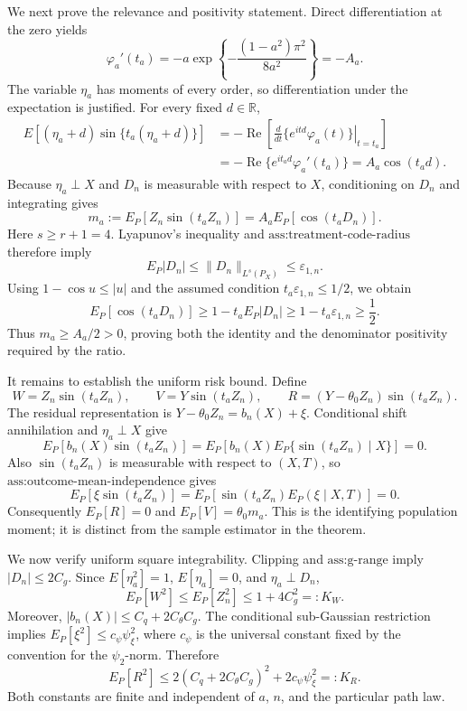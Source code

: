 We next prove the relevance and positivity statement.  Direct differentiation at the zero yields
\[
 \varphi_a'(t_a)
 =-a\exp\!\left\{-\frac{(1-a^2)\pi^2}{8a^2}\right\}
 =-A_a.
\]
The variable \(\eta_a\) has moments of every order, so differentiation under the expectation is justified.  For every fixed \(d\in\mathbb R\),
\[
\begin{aligned}
 E[(\eta_a+d)\sin\{t_a(\eta_a+d)\}]
 &=-\operatorname{Re}\!\left[
   \left.\frac{d}{dt}\{e^{itd}\varphi_a(t)\}\right|_{t=t_a}
 \right]\\
 &=-\operatorname{Re}\{e^{it_ad}\varphi_a'(t_a)\}
 =A_a\cos(t_ad).
\end{aligned}
\]
Because \(\eta_a\perp X\) and \(D_n\) is measurable with respect to \(X\), conditioning on \(D_n\) and integrating gives
\[
 m_a:=E_P[Z_n\sin(t_aZ_n)]
 =A_aE_P[\cos(t_aD_n)].
\]
Here \(s\geq r+1=4\).  Lyapunov's inequality and \(\text{ass:treatment-code-radius}\) therefore imply
\[
 E_P|D_n|
 \leq \|D_n\|_{L^s(P_X)}
 \leq \varepsilon_{1,n}.
\]
Using \(1-\cos u\leq |u|\) and the assumed condition \(t_a\varepsilon_{1,n}\leq1/2\), we obtain
\[
 E_P[\cos(t_aD_n)]
 \geq1-t_aE_P|D_n|
 \geq1-t_a\varepsilon_{1,n}
 \geq\frac12.
\]
Thus \(m_a\geq A_a/2>0\), proving both the identity and the denominator positivity required by the ratio.

It remains to establish the uniform risk bound.  Define
\[
 W=Z_n\sin(t_aZ_n),
 \qquad
 V=Y\sin(t_aZ_n),
 \qquad
 R=(Y-\theta_0Z_n)\sin(t_aZ_n).
\]
The residual representation is \(Y-\theta_0Z_n=b_n(X)+\xi\).  Conditional shift annihilation and \(\eta_a\perp X\) give
\[
 E_P[b_n(X)\sin(t_aZ_n)]
 =E_P\!\left[b_n(X)E_P\{\sin(t_aZ_n)\mid X\}\right]=0.
\]
Also \(\sin(t_aZ_n)\) is measurable with respect to \((X,T)\), so \(\text{ass:outcome-mean-independence}\) gives
\[
 E_P[\xi\sin(t_aZ_n)]
 =E_P\!\left[\sin(t_aZ_n)E_P(\xi\mid X,T)\right]=0.
\]
Consequently \(E_P[R]=0\) and \(E_P[V]=\theta_0m_a\).  This is the identifying population moment; it is distinct from the sample estimator in the theorem.

We now verify uniform square integrability.  Clipping and \(\text{ass:g-range}\) imply \(|D_n|\leq2C_g\).  Since \(E[\eta_a^2]=1\), \(E[\eta_a]=0\), and \(\eta_a\perp D_n\),
\[
 E_P[W^2]
 \leq E_P[Z_n^2]
 \leq 1+4C_g^2
 =:K_W.
\]
Moreover, \(|b_n(X)|\leq C_q+2C_{\theta}C_g\).  The conditional sub-Gaussian restriction implies \(E_P[\xi^2]\leq c_{\psi}\psi_{\xi}^2\), where \(c_{\psi}\) is the universal constant fixed by the convention for the \(\psi_2\)-norm.  Therefore
\[
 E_P[R^2]
 \leq 2(C_q+2C_{\theta}C_g)^2+2c_{\psi}\psi_{\xi}^2
 =:K_R.
\]
Both constants are finite and independent of \(a\), \(n\), and the particular path law.

